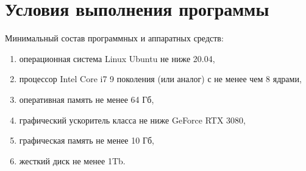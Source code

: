 \newpage
\section{Условия выполнения программы}

Минимальный состав программных и аппаратных средств:
\begin{enumerate}
  \item операционная система Linux Ubuntu не ниже 20.04,
  \item процессор Intel Core i7 9 поколения (или аналог) с не менее чем 8 ядрами,
  \item оперативная память не менее 64 Гб,
  \item графический ускоритель класса не ниже GeForce RTX 3080,
  \item графическая память не менее 10 Гб,
  \item жесткий диск не менее 1Tb.        
\end{enumerate}
